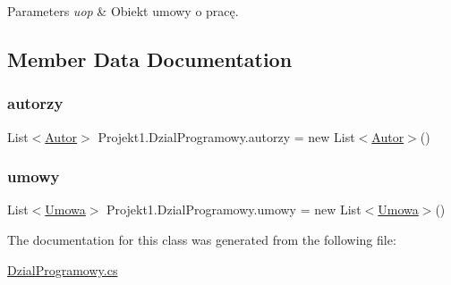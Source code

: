 \begin{DoxyParams}{Parameters}
{\em uop} & Obiekt umowy o pracę.\\
\hline
\end{DoxyParams}


\subsection{Member Data Documentation}
\mbox{\label{class_projekt1_1_1_dzial_programowy_aa115c071c0608e10798a1ca503bc8181}} 
\subsubsection{\texorpdfstring{autorzy}{autorzy}}
{\footnotesize\ttfamily List$<$\mbox{\hyperlink{class_projekt1_1_1_autor}{Autor}}$>$ Projekt1.\+Dzial\+Programowy.\+autorzy = new List$<$\mbox{\hyperlink{class_projekt1_1_1_autor}{Autor}}$>$()}

\mbox{\label{class_projekt1_1_1_dzial_programowy_a0971983aaa0d5e26960a30ee22974301}} 
\subsubsection{\texorpdfstring{umowy}{umowy}}
{\footnotesize\ttfamily List$<$\mbox{\hyperlink{class_projekt1_1_1_umowa}{Umowa}}$>$ Projekt1.\+Dzial\+Programowy.\+umowy = new List$<$\mbox{\hyperlink{class_projekt1_1_1_umowa}{Umowa}}$>$()}



The documentation for this class was generated from the following file\+:\begin{DoxyCompactItemize}
\item 
\mbox{\hyperlink{_dzial_programowy_8cs}{Dzial\+Programowy.\+cs}}\end{DoxyCompactItemize}
